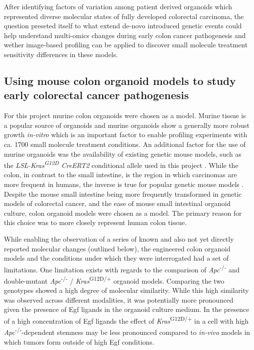 \begin{flushleft}
After identifying factors of variation among patient derived organoids which represented diverse molecular states of fully developed colorectal carcinoma, the question preseted itself to what extend de-novo introduced genetic events could help understand multi-omics changes during early colon cancer pathogenesis and wether image-based profiling can be applied to discover small molecule treatment sensitivity differences in these models. 

\subsection{Using mouse colon organoid models to study early colorectal cancer pathogenesis}

For this project murine colon organoids were chosen as a model. Murine tissue is a popular source of organoids \parencite{satoSingleLgr5Stem2009} and murine organoids show a generally more robust growth \textit{in-vitro} which is an important factor to enable profiling experiments with ca. 1700 small molecule treatment conditions. An additional factor for the use of murine organoids was the availability of existing genetic mouse models, such as the \textit{LSL-Kras\textsuperscript{G12D} CreERT2} conditional allele used in this project \parencite{jacksonAnalysisLungTumor2001}. While the colon, in contrast to the small intestine, is the region in which carcinomas are more frequent in humans, the inverse is true for popular genetic mouse models \parencite{luoMutatedKrasAsp12Promotes2009}. Despite the mouse small intestine being more frequently transformed in genetic models of colorectal cancer, and the ease of mouse small intestinal organoid culture, colon organoid models were chosen as a model. The primary reason for this choice was to more closely represent human colon tissue. 
\par

While enabling the observation of a series of known and also not yet directly reported molecular changes (outlined below), the engineered colon organoid models and the conditions under which they were interrogated had a set of limitations. One limitation exists with regards to the comparison of \textit{Apc}\textsuperscript{-/-} and double-mutant \textit{Apc}\textsuperscript{-/-} / \textit{Kras}\textsuperscript{G12D/+} organoid models. Comparing the two genotypes showed a high degree of molecular similarity. While this high similarity was observed across different modalities, it was potentially more pronounced given the presence of Egf ligands in the organoid culture medium. In the presence of a high concentration of Egf ligands the effect of \textit{Kras}\textsuperscript{G12D/+} in a cell with high \textit{Apc}\textsuperscript{-/-}-dependent stemness may be less pronounced compared to \textit{in-vivo} models in which tumors form outside of high Egf conditions. 


\end{flushleft}
